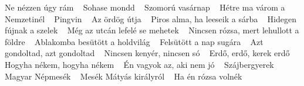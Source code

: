 \footnotesize Ne nézzen úgy rám \ \textbf{\pageref{A9zzenC3BAgyrC3A1m}} \newline
\footnotesize Sohase mondd \ \textbf{\pageref{mondd}} \newline
\footnotesize Szomorú vasárnap \ \textbf{\pageref{C3BAvasC3A1rnap}} \newline
\footnotesize Hétre ma várom a Nemzetinél \ \textbf{\pageref{tremavC3A1romaNemzetinC3A9l}} \newline
\footnotesize Pingvin \ \textbf{\pageref{}} \newline
\footnotesize Az ördög útja \ \textbf{\pageref{B6rdC3B6gC3BAtja}} \newline
\footnotesize Piros alma, ha leeseik a sárba \ \textbf{\pageref{lma2ChaleeseikasC3A1rba}} \newline
\footnotesize Hidegen fújnak a szelek \ \textbf{\pageref{fC3BAjnakaszelek}} \newline
\footnotesize Még az utcán lefelé se mehetek \ \textbf{\pageref{gazutcC3A1nlefelC3A9semehetek}} \newline
\footnotesize Nincsen rózsa, mert lehullott a földre \ \textbf{\pageref{rC3B3zsa2CmertlehullottafC3B6ldre}} \newline
\footnotesize Ablakomba besütött a holdvilág \ \textbf{\pageref{babesC3BCtC3B6ttaholdvilC3A1g}} \newline
\footnotesize Felsütött a nap sugára \ \textbf{\pageref{BCtC3B6ttanapsugC3A1ra}} \newline
\footnotesize Azt gondoltad, azt gondoltad \ \textbf{\pageref{doltad2Caztgondoltad}} \newline
\footnotesize Nincsen kenyér, nincsen só \ \textbf{\pageref{kenyC3A9r2CnincsensC3B3}} \newline
\footnotesize Erdő, erdő, kerek erdő \ \textbf{\pageref{912CerdC5912CkerekerdC591}} \newline
\footnotesize Hogyha nékem, hogyha nékem \ \textbf{\pageref{nC3A9kem2ChogyhanC3A9kem}} \newline
\footnotesize Én vagyok az, aki nem jó \ \textbf{\pageref{vagyokaz2CakinemjC3B3}} \newline
\footnotesize Szájbergyerek \ \textbf{\pageref{1jbergyerek}} \newline
\footnotesize Magyar Népmesék \ \textbf{\pageref{NC3A9pmesC3A9k}} \newline
\footnotesize Mesék Mátyás királyról \ \textbf{\pageref{A9kMC3A1tyC3A1skirC3A1lyrC3B3l}} \newline
\footnotesize Ha én rózsa volnék \ \textbf{\pageref{A9nrC3B3zsavolnC3A9k}} \newline
